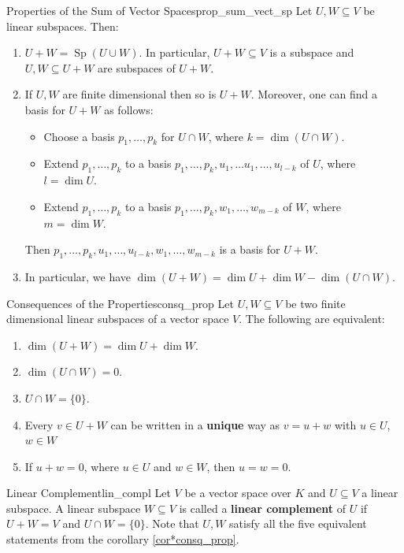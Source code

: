 \begin{proposition}{Properties of the Sum of Vector Spaces}{prop_sum_vect_sp}
	Let $U, W \subseteq V$ be linear subspaces. Then:
	\begin{enumerate}
		\item $U + W = \operatorname{Sp}(U \cup W)$. In particular, $U + W \subseteq V$ is a subspace and $U, W \subseteq U + W$ are subspaces of $U + W$.

		\item If $U, W$ are finite dimensional then so is $U + W$. Moreover, one can find a basis for $U + W$ as follows: 
		\begin{itemize}
			\item[(a)] Choose a basis $p_1, \hdots , p_k$ for $U \cap W$, where $k = \dim(U \cap W)$.
			\item[(b)] Extend $p_1, \hdots , p_k$ to a basis $p_1, \hdots , p_k, u_1, \hdots u_1, \hdots , u_{l - k}$ of $U$, where $l = \dim U$.
			\item[(c)] Extend $p_1, \hdots , p_k$ to a basis $p_1, \hdots , p_k, w_1, \hdots , w_{m-k}$ of $W$, where $m = \dim W$.
		\end{itemize}
		Then $p_1, \hdots , p_k, u_1, \hdots , u_{l-k}, w_1, \hdots , w_{m-k}$ is a basis for $U + W$.
		\item In particular, we have $\dim(U+ W) = \dim U + \dim W - \dim(U \cap W)$.
	\end{enumerate}
\end{proposition}

\begin{corollary}{Consequences of the Properties}{consq_prop}
	Let $U, W \subseteq V$ be two finite dimensional linear subspaces of a vector space $V$. The following are equivalent:
	\begin{enumerate}
		\item $\dim(U + W) = \dim U + \dim W$.
		\item $\dim(U \cap W) = 0$.
		\item $U \cap W = \{0\}$.
		\item Every $v \in U + W$ can be written in a \textbf{unique} way as $v = u + w$ with $u \in U$, $w \in W$
		\item If $u + w = 0$, where $u \in U$ and $w \in W$, then $u = w = 0$.
	\end{enumerate}
\end{corollary}

\begin{definition}{Linear Complement}{lin_compl}
	Let $V$ be a vector space over $K$ and $U \subseteq V$ a linear subspace. A linear subspace $W \subseteq V$ is called a \textbf{linear complement} of $U$ if $U + W = V$ and $U \cap W = \{0\}$.
	Note that $U, W$ satisfy all the five equivalent statements from the corollary \ref{cor*consq_prop}.
\end{definition}

